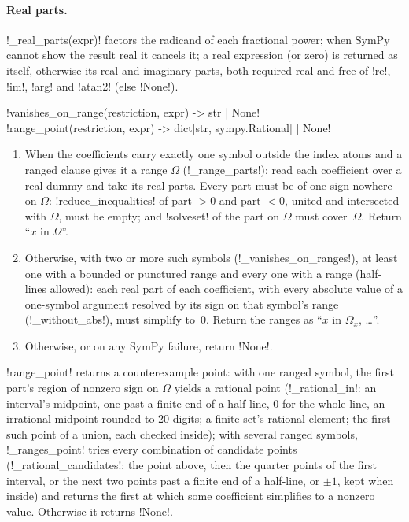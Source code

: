 \paragraph{Real parts.} \py!_real_parts(expr)! factors the radicand of each fractional power; when SymPy cannot show the result real it cancels it; a real expression (or zero) is returned as itself, otherwise its real and imaginary parts, both required real and free of \code!re!, \code!im!, \code!arg! and \code!atan2! (else \py!None!).

\begin{signature}
\py!vanishes_on_range(restriction, expr) -> str | None!\\
\py!range_point(restriction, expr) -> dict[str, sympy.Rational] | None!
\end{signature}

\begin{algorithm}\label{alg:semantics-vanishes}
\begin{enumerate}
\item When the coefficients carry exactly one symbol outside the index atoms and a ranged clause gives it a range $\Omega$ (\py!_range_parts!): read each coefficient over a real dummy and take its real parts. Every part must be of one sign nowhere on $\Omega$: \py!reduce_inequalities! of part $>0$ and part $<0$, united and intersected with $\Omega$, must be empty; and \py!solveset! of the part on $\Omega$ must cover~$\Omega$. Return ``$x$ in $\Omega$''.
\item Otherwise, with two or more such symbols (\py!_vanishes_on_ranges!), at least one with a bounded or punctured range and every one with a range (half-lines allowed): each real part of each coefficient, with every absolute value of a one-symbol argument resolved by its sign on that symbol's range (\py!_without_abs!), must simplify to~0. Return the ranges as ``$x$ in $\Omega_x$, \ldots''.
\item Otherwise, or on any SymPy failure, return \py!None!.
\end{enumerate}
\end{algorithm}

\py!range_point! returns a counterexample point: with one ranged symbol, the first part's region of nonzero sign on $\Omega$ yields a rational point (\py!_rational_in!: an interval's midpoint, one past a finite end of a half-line, $0$ for the whole line, an irrational midpoint rounded to 20 digits; a finite set's rational element; the first such point of a union, each checked inside); with several ranged symbols, \py!_ranges_point! tries every combination of candidate points (\py!_rational_candidates!: the point above, then the quarter points of the first interval, or the next two points past a finite end of a half-line, or $\pm1$, kept when inside) and returns the first at which some coefficient simplifies to a nonzero value. Otherwise it returns \py!None!.

